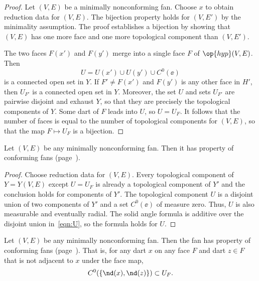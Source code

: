 \begin{proof} Let $(V,E)$ be a minimally nonconforming fan.  Choose
  $x$ to obtain reduction data for $(V,E)$.  The bijection property
  holds for $(V,E')$ by the minimality assumption.  The proof 
  establishes a bijection by showing that $(V,E)$ has one more face and
  one more topological component than $(V,E')$.

The
two faces $F(x')$ and $F(y')$ merge into a single face $F$ of
$\op{hyp}(V,E)$.  Then
\begin{equation}\label{eqn:U}
U= U(x')\cup U(y')\cup C^0(\ee)
\end{equation} 
is a connected open set in $Y$.  If $F'\ne F(x')$ and $F(y')$ is any other
face in $H'$, then $U_{F'}$ is a connected open set in $Y$.  Moreover,
the set $U$ and sets $U_{F'}$ are pairwise disjoint and exhaust $Y$,
so that they are precisely the topological components of $Y$.  Some
dart of $F$ leads into $U$, so $U=U_F$. 
It follows that the number of
faces is equal to the number of topological components for $(V,E)$, so that the
map $F\mapsto U_F$ is a bijection.
\end{proof}


\begin{lemma}[]\cutrate{} Let $(V,E)$ be any minimally
nonconforming fan.  Then it has property  of
conforming fans (page~\pageref{def:conforming}).
\end{lemma}

\begin{proof} Choose reduction data for $(V,E)$.  Every topological
component of $Y=Y(V,E)$ except $U=U_F$ is already a topological
component of $Y'$ and the conclusion holds for components of $Y'$.
The topological component $U$ is a disjoint union of two components
of $Y'$ and a set $C^0(\ee)$ of measure zero.  Thus, $U$ is also
measurable and eventually radial.  The solid angle formula is
additive over the disjoint union in~\eqref{eqn:U}, so the formula
holds for $U$.
\end{proof}
%


\begin{lemma}[]\cutrate{} 
  Let $(V,E)$ be any minimally nonconforming fan.  Then the fan has property
   of conforming fans (page~\pageref{def:conforming}).
  That is, for any dart $x$ on any face $F$ and dart $z\in F$ that is
  not adjacent to $x$ under the face map,
\[ 
C^0(\{\nd(x),\nd(z)\}) \subset U_F.
\] 
\end{lemma}

